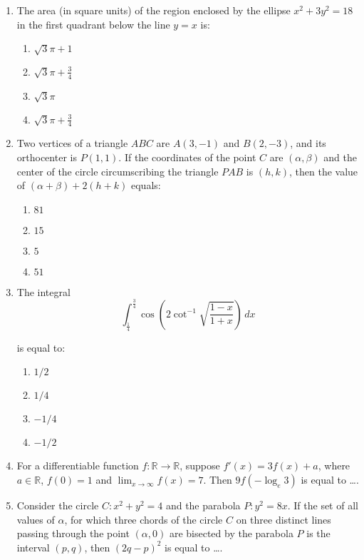 \documentclass[journal]{IEEEtran}
\numberwithin{figure}{enumi}
\begin{document}
\begin{enumerate}
    \item The area (in square units) of the region enclosed by the ellipse $x^2 + 3y^2 = 18$ in the first quadrant below the line $y = x$ is:
    \begin{enumerate}
        \item ${\sqrt{3}\pi + 1}$
        \item $\sqrt{3}\pi +\frac{3}{4}$
        \item ${\sqrt{3}\pi}$
        \item $\sqrt{3}\pi +\frac{3}{4}$
    \end{enumerate}

    \item Two vertices of a triangle $ABC$ are $A(3, -1)$ and $B(2, -3)$, and its orthocenter is $P(1,1)$. If the coordinates of the point $C$ are $(\alpha,\beta)$ and the center of the circle circumscribing the triangle $PAB$ is $(h,k)$, then the value of $(\alpha+\beta) + 2(h+k)$ equals:
    \begin{enumerate}
        \item $81$
        \item $15$
        \item $5$
        \item $51$
    \end{enumerate}

    \item The integral
    \begin{equation*}
\int_{\frac{1}{4}}^{\frac{3}{4}} \cos\left( 2 \cot^{-1} \sqrt{\frac{1 - x}{1 + x}} \right) \, dx
\end{equation*}

    is equal to:
    \begin{enumerate}
        \item $1/2$
        \item $1/4$
        \item $-1/4$
        \item $-1/2$
    \end{enumerate}

\item For a differentiable function $f : \mathbb{R} \to \mathbb{R}$, suppose $f'(x) = 3f(x) + a$, where $a \in \mathbb{R}$, 
$f(0) = 1$ and $\lim_{x \to \infty} f(x) = 7$. Then $9f(-\log_e 3)$ is equal to \dots.

\item Consider the circle $C: x^2 + y^2 = 4$ and the parabola $P: y^2 = 8x$. If the set of all values of $\alpha$, for which three chords of the circle $C$ on three distinct lines passing through the point $(\alpha, 0)$ are bisected by the parabola $P$ is the interval $(p, q)$, then $(2q - p)^2$ is equal to \dots.


\end{enumerate}
\end{document}
